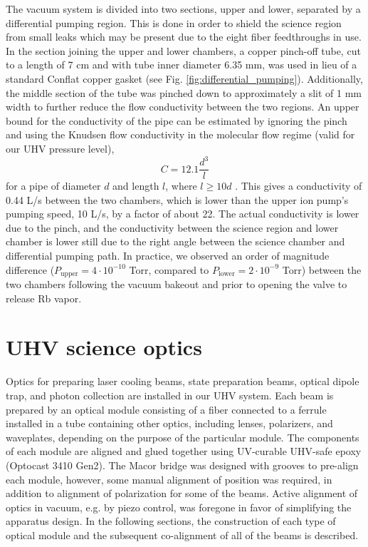 The vacuum system is divided into two sections, upper and lower, separated by a differential pumping region. This is done in order to shield the science region from small leaks which may be present due to the eight fiber feedthroughs in use. In the section joining the upper and lower chambers, a copper pinch-off tube, cut to a length of 7 cm and with tube inner diameter 6.35 mm, was used in lieu of a standard Conflat copper gasket (see Fig. \ref{fig:differential_pumping}). Additionally, the middle section of the tube was pinched down to approximately a slit of 1 mm width to further reduce the flow conductivity between the two regions. An upper bound for the conductivity of the pipe can be estimated by ignoring the pinch and using the Knudsen flow conductivity in the molecular flow regime (valid for our UHV pressure level),
\begin{equation}
     C = 12.1\frac{d^3}{l}
\end{equation}
for a pipe of diameter $d$ and length $l$, where $l \geq 10d$ \cite{Marquardt1999}. This gives a conductivity of 0.44 L/s between the two chambers, which is lower than the upper ion pump's pumping speed, 10 L/s, by a factor of about 22. The actual conductivity is lower due to the pinch, and the conductivity between the science region and lower chamber is lower still due to the right angle between the science chamber and differential pumping path. In practice, we observed an order of magnitude difference ($P_{\textrm{upper}}=4\cdot10^{-10}$ Torr, compared to $P_{\textrm{lower}}=2\cdot10^{-9}$ Torr) between the two chambers following the vacuum bakeout and prior to opening the valve to release Rb vapor. 

\section{UHV science optics}\label{sec:science_optics}

Optics for preparing laser cooling beams, state preparation beams, optical dipole trap, and photon collection are installed in our UHV system. Each beam is prepared by an optical module consisting of a fiber connected to a ferrule installed in a tube containing other optics, including lenses, polarizers, and waveplates, depending on the purpose of the particular module. The components of each module are aligned and glued together using UV-curable UHV-safe epoxy (Optocast 3410 Gen2). The Macor bridge was designed with grooves to pre-align each module, however, some manual alignment of position was required, in addition to alignment of polarization for some of the beams. Active alignment of optics in vacuum, e.g. by piezo control, was foregone in favor of simplifying the apparatus design. In the following sections, the construction of each type of optical module and the subsequent co-alignment of all of the beams is described. 

